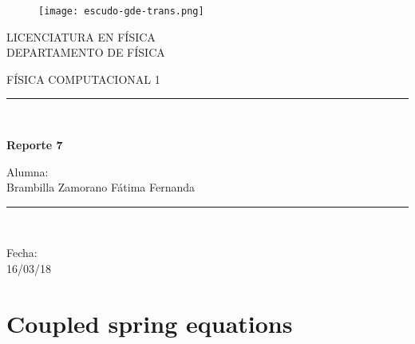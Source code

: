\documentclass{article}
\begin{document}
\begin{titlepage}
\begin{center}
    \vspace*{-1in}
    \begin{figure}[htb]
    \begin{center}
    \texttt{[image: escudo-gde-trans.png]}
    \end{center}
\end{figure}
\begin{center}
LICENCIATURA EN FÍSICA \\
\vspace*{0.15in}
DEPARTAMENTO DE FÍSICA \\
\vspace*{0.6in}
\begin{large}
FÍSICA COMPUTACIONAL 1 \\
\end{large}
\vspace*{0.2in}
\rule{80mm}{0.1mm}\\
\vspace*{0.1in}
\begin{large}
\textbf{Reporte 7\\ }
\end{large}
\vspace*{0.3in}
\begin{large}
Alumna: \\
\vspace*{0.1in}
Brambilla Zamorano Fátima Fernanda\\
\end{large}
\vspace*{0.3in}
\rule{80mm}{0.1mm}\\
\vspace*{0.1in}
\begin{large}
Fecha: \\ 16/03/18\\
\end{large}
\end{center}
\end{center}
\end{titlepage}

\section{Coupled spring equations}
\end{document}
